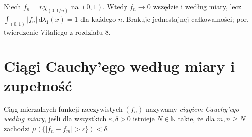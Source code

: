 \begin{przyklad}
Niech $f_n=n\chi_{(0,1/n)}$ na $(0,1)$.
Wtedy $f_n\to0$ wszędzie i według miary, lecz
$\int_{(0,1)}|f_n|\,\mathrm d\lambda_1(x)=1$
dla każdego $n$. Brakuje jednostajnej całkowalności;
por. twierdzenie Vitaliego z rozdziału 8.
\end{przyklad}

\section{Ciągi Cauchy'ego według miary i zupełność}

\begin{definicja}
\label{def:cauchy-measure-9}
Ciąg mierzalnych funkcji rzeczywistych $(f_n)$
nazywamy \emph{ciągiem Cauchy'ego według miary}, jeśli
dla wszystkich $\varepsilon,\delta>0$ istnieje
$N\in\mathbb N$ takie, że dla $m,n\ge N$
zachodzi $\mu(\{|f_n-f_m|>\varepsilon\})<\delta$.
\end{definicja}


